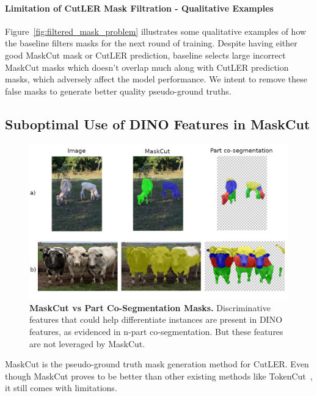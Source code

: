 \paragraph{Limitation of CutLER Mask Filtration - Qualitative Examples}

Figure~\ref{fig:filtered_mask_problem} illustrates some qualitative examples of how the baseline filters masks for the next round of training. Despite having either good MaskCut mask or CutLER prediction, baseline selects large incorrect MaskCut masks which doesn't overlap much along with CutLER prediction masks, which adversely affect the model performance. We intent to remove these false masks to generate better quality pseudo-ground truths.

\subsection{Suboptimal Use of DINO Features in MaskCut}
\label{section:limitations_of_MaskCut}

\begin{figure}
	\centering
	\includegraphics[width=1\textwidth]{Images/main/part-cosegm.png}
	\caption[\textbf{MaskCut vs Part Co-Segmentation Masks}]{\textbf{MaskCut vs Part Co-Segmentation Masks.} Discriminative features that could help differentiate instances are present in DINO features, as evidenced in n-part co-segmentation. But these features are not leveraged by MaskCut. }
	\label{fig:maskcut-instance-indifference}
\end{figure}

MaskCut is the pseudo-ground truth mask generation method for CutLER. Even though MaskCut proves to be better than other existing methods like TokenCut~\cite{wang2023cut}, it still comes with limitations. 

